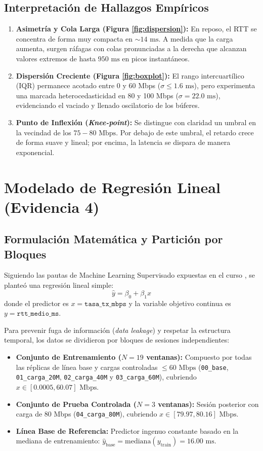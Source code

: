 \documentclass[10pt,twocolumn,letterpaper]{article}
\begin{document}
\subsection{Interpretación de Hallazgos Empíricos}
\begin{enumerate}
    \item \textbf{Asimetría y Cola Larga (Figura \ref{fig:dispersion}):} En reposo, el RTT se concentra de forma muy compacta en $\sim 14\text{ ms}$. A medida que la carga aumenta, surgen ráfagas con colas pronunciadas a la derecha que alcanzan valores extremos de hasta $950\text{ ms}$ en picos instantáneos.
    \item \textbf{Dispersión Creciente (Figura \ref{fig:boxplot}):} El rango intercuartílico (IQR) permanece acotado entre 0 y 60 Mbps ($\sigma \le 1.6\text{ ms}$), pero experimenta una marcada heterocedasticidad en 80 y 100 Mbps ($\sigma = 22.0\text{ ms}$), evidenciando el vaciado y llenado oscilatorio de los búferes.
    \item \textbf{Punto de Inflexión (\textit{Knee-point}):} Se distingue con claridad un umbral en la vecindad de los $75-80\text{ Mbps}$. Por debajo de este umbral, el retardo crece de forma suave y lineal; por encima, la latencia se dispara de manera exponencial.
\end{enumerate}

\section{Modelado de Regresión Lineal (Evidencia 4)}

\subsection{Formulación Matemática y Partición por Bloques}
Siguiendo las pautas de Machine Learning Supervisado expuestas en el curso \cite{hurbans2020grokking}, se planteó una regresión lineal simple:
\begin{equation}
    \hat{y} = \beta_0 + \beta_1 x
\end{equation}
donde el predictor es $x = \texttt{tasa\_tx\_mbps}$ y la variable objetivo continua es $y = \texttt{rtt\_medio\_ms}$.

Para prevenir fuga de información (\textit{data leakage}) y respetar la estructura temporal, los datos se dividieron por bloques de sesiones independientes:
\begin{itemize}
    \item \textbf{Conjunto de Entrenamiento ($N=19$ ventanas):} Compuesto por todas las réplicas de línea base y cargas controladas $\le 60\text{ Mbps}$ (\texttt{00\_base}, \texttt{01\_carga\_20M}, \texttt{02\_carga\_40M} y \texttt{03\_carga\_60M}), cubriendo $x \in [0.0005, 60.07]\text{ Mbps}$.
    \item \textbf{Conjunto de Prueba Controlada ($N=3$ ventanas):} Sesión posterior con carga de 80 Mbps (\texttt{04\_carga\_80M}), cubriendo $x \in [79.97, 80.16]\text{ Mbps}$.
    \item \textbf{Línea Base de Referencia:} Predictor ingenuo constante basado en la mediana de entrenamiento: $\hat{y}_{\text{base}} = \text{mediana}(y_{\text{train}}) = 16.00\text{ ms}$.
\end{itemize}
\end{document}
